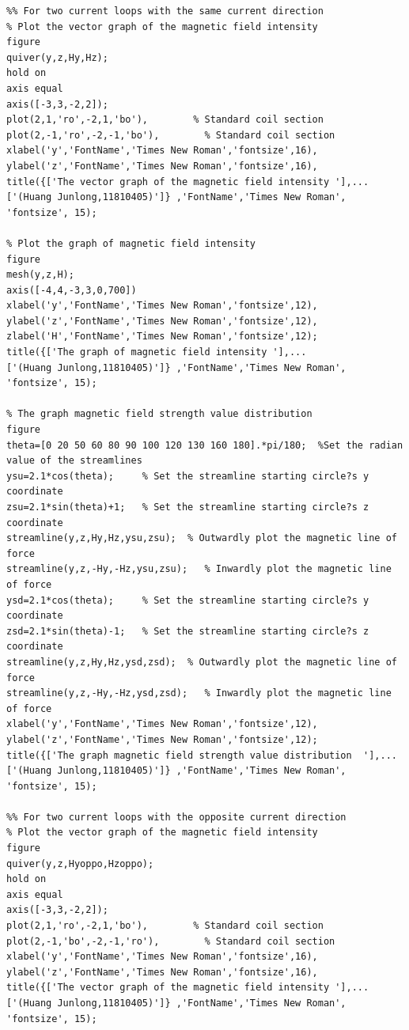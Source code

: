 \documentclass[journal,twocolumn,letterpaper]{IEEEJERM}
\begin{document}
\begin{lstlisting}
%% For two current loops with the same current direction
% Plot the vector graph of the magnetic field intensity
figure
quiver(y,z,Hy,Hz);                    
hold on     
axis equal
axis([-3,3,-2,2]); 
plot(2,1,'ro',-2,1,'bo'),        % Standard coil section
plot(2,-1,'ro',-2,-1,'bo'),        % Standard coil section
xlabel('y','FontName','Times New Roman','fontsize',16),
ylabel('z','FontName','Times New Roman','fontsize',16),   
title({['The vector graph of the magnetic field intensity '],...
['(Huang Junlong,11810405)']} ,'FontName','Times New Roman', 'fontsize', 15);

% Plot the graph of magnetic field intensity
figure
mesh(y,z,H);   
axis([-4,4,-3,3,0,700])   
xlabel('y','FontName','Times New Roman','fontsize',12),
ylabel('z','FontName','Times New Roman','fontsize',12),
zlabel('H','FontName','Times New Roman','fontsize',12);
title({['The graph of magnetic field intensity '],...
['(Huang Junlong,11810405)']} ,'FontName','Times New Roman', 'fontsize', 15);

% The graph magnetic field strength value distribution 
figure
theta=[0 20 50 60 80 90 100 120 130 160 180].*pi/180;  %Set the radian value of the streamlines
ysu=2.1*cos(theta);     % Set the streamline starting circle?s y coordinate
zsu=2.1*sin(theta)+1;   % Set the streamline starting circle?s z coordinate
streamline(y,z,Hy,Hz,ysu,zsu);  % Outwardly plot the magnetic line of force 	
streamline(y,z,-Hy,-Hz,ysu,zsu);   % Inwardly plot the magnetic line of force 
ysd=2.1*cos(theta);     % Set the streamline starting circle?s y coordinate
zsd=2.1*sin(theta)-1;   % Set the streamline starting circle?s z coordinate
streamline(y,z,Hy,Hz,ysd,zsd);  % Outwardly plot the magnetic line of force 	
streamline(y,z,-Hy,-Hz,ysd,zsd);   % Inwardly plot the magnetic line of force 
xlabel('y','FontName','Times New Roman','fontsize',12),
ylabel('z','FontName','Times New Roman','fontsize',12);
title({['The graph magnetic field strength value distribution  '],...
['(Huang Junlong,11810405)']} ,'FontName','Times New Roman', 'fontsize', 15);

%% For two current loops with the opposite current direction
% Plot the vector graph of the magnetic field intensity
figure
quiver(y,z,Hyoppo,Hzoppo);                    
hold on     
axis equal
axis([-3,3,-2,2]); 
plot(2,1,'ro',-2,1,'bo'),        % Standard coil section
plot(2,-1,'bo',-2,-1,'ro'),        % Standard coil section
xlabel('y','FontName','Times New Roman','fontsize',16),
ylabel('z','FontName','Times New Roman','fontsize',16),   
title({['The vector graph of the magnetic field intensity '],...
['(Huang Junlong,11810405)']} ,'FontName','Times New Roman', 'fontsize', 15);


\end{lstlisting}
\end{document}
